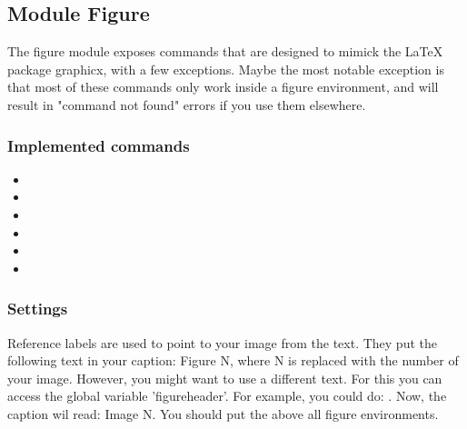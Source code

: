 \begin{page}
\subsection{Module Figure}
	
\begin{paragraph}
    The figure module exposes commands that are designed to mimick the LaTeX package graphicx, with a few exceptions. 
    Maybe the most notable exception is that most of these commands only work inside a figure environment, and will result in "command not found" errors if you use them elsewhere.
\end{paragraph}

\subsubsection{Implemented commands}
\begin{itemize}
    \item {}
    \item {}
    \item {}
    \item {}
    \item {}
    \item {}
\end{itemize}

\subsubsection{Settings}
\begin{paragraph}
    Reference labels are used to point to your image from the text. They put the following text in your caption: Figure N, where N is replaced with the number of your image. However, you might want to use a different text. For this you can access the global variable 'figureheader'. For example, you could do: . Now, the caption wil read: Image N. You should put the  above all figure environments.
\end{paragraph}


\end{page}
